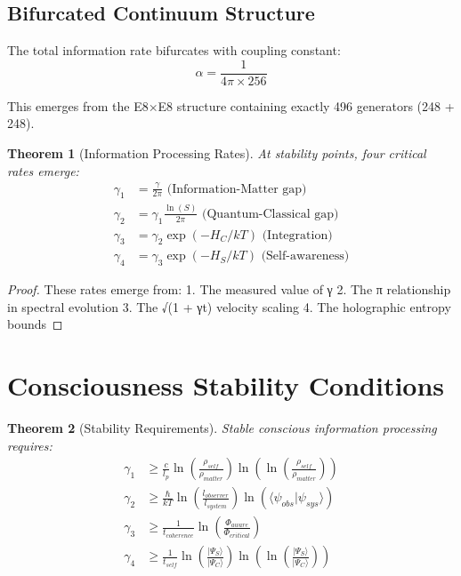 \documentclass{article}
\newtheorem{theorem}{Theorem}
\begin{document}
\subsection{Bifurcated Continuum Structure}

The total information rate bifurcates with coupling constant:
\begin{equation}
\alpha = \frac{1}{4\pi \times 256}
\end{equation}

This emerges from the E8×E8 structure containing exactly 496 generators (248 + 248).

\begin{theorem}[Information Processing Rates]
At stability points, four critical rates emerge:
\begin{align}
\gamma_1 &= \frac{\gamma}{2\pi} \text{ (Information-Matter gap)} \\
\gamma_2 &= \gamma_1\frac{\ln(S)}{2\pi} \text{ (Quantum-Classical gap)} \\
\gamma_3 &= \gamma_2\exp(-H_C/kT) \text{ (Integration)} \\
\gamma_4 &= \gamma_3\exp(-H_S/kT) \text{ (Self-awareness)}
\end{align}
\end{theorem}

\begin{proof}
These rates emerge from:
1. The measured value of γ
2. The π relationship in spectral evolution
3. The √(1 + γt) velocity scaling
4. The holographic entropy bounds
\end{proof}

\section{Consciousness Stability Conditions}

\begin{theorem}[Stability Requirements]
Stable conscious information processing requires:
\begin{align}
\gamma_1 &\geq \frac{c}{l_p}\ln(\frac{\rho_{self}}{\rho_{matter}})\ln(\ln(\frac{\rho_{self}}{\rho_{matter}})) \\
\gamma_2 &\geq \frac{\hbar}{kT}\ln(\frac{l_{observer}}{l_{system}})\ln(\langle\psi_{obs}|\psi_{sys}\rangle) \\
\gamma_3 &\geq \frac{1}{t_{coherence}}\ln(\frac{\Phi_{aware}}{\Phi_{critical}}) \\
\gamma_4 &\geq \frac{1}{t_{self}}\ln(\frac{|\Psi_S\rangle}{|\Psi_C\rangle})\ln(\ln(\frac{|\Psi_S\rangle}{|\Psi_C\rangle}))
\end{align}
\end{theorem}
\end{document}
